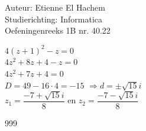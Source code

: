 \documentclass[a4paper]{article}
\begin{document}
  
\noindent \large Auteur: Etienne El Hachem \\
\noindent \large Studierichting: Informatica\\
\noindent \large Oefeningenreeks 1B nr. 40.22\\

\medskip

\normalsize

$4(z + 1)^2 - z = 0$\\

$4z^2 + 8z + 4 - z = 0$\\

$4z^2 + 7z + 4 = 0$\\

$D = 49 - 16 \cdot 4 = -15$    $\Rightarrow d = \pm \sqrt{15}i$\\

$z_1 = \dfrac{-7 + \sqrt{15}i}{8}$ en $z_2 = \dfrac{-7 - \sqrt{15}i}{8}$

\begin{thebibliography}{999}
\end{thebibliography}
\end{document}
